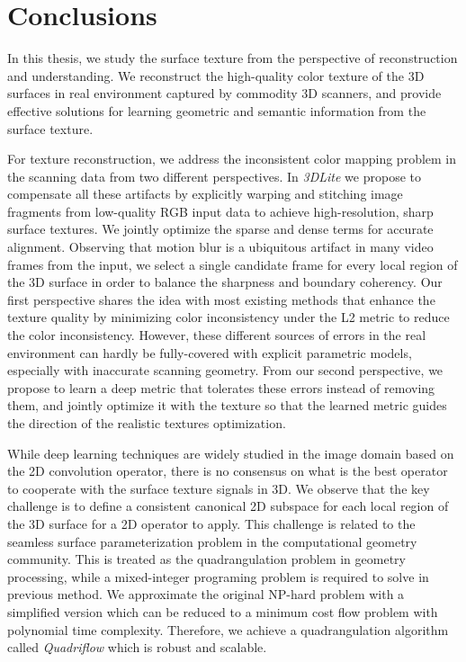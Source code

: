 \chapter{Conclusions}
\label{chapter:conclude}
In this thesis, we study the surface texture from the perspective of reconstruction and understanding. We reconstruct the high-quality color texture of the 3D surfaces in real environment captured by commodity 3D scanners, and provide effective solutions for learning geometric and semantic information from the surface texture.

For texture reconstruction, we address the inconsistent color mapping problem in the scanning data from two different perspectives. In \emph{3DLite} we propose to compensate all these artifacts by explicitly warping and stitching image fragments from low-quality RGB input data to achieve high-resolution, sharp surface textures. We jointly optimize the sparse and dense terms for accurate alignment. Observing that motion blur is a ubiquitous artifact in many video frames from the input, we select a single candidate frame for every local region of the 3D surface in order to balance the sharpness and boundary coherency.
%
Our first perspective shares the idea with most existing methods that enhance the texture quality by minimizing color inconsistency under the L2 metric to reduce the color inconsistency.
%
However, these different sources of errors in the real environment can hardly be fully-covered with explicit parametric models, especially with inaccurate scanning geometry.
%
From our second perspective, we propose to learn a deep metric that tolerates these errors instead of removing them, and jointly optimize it with the texture so that the learned metric guides the direction of the realistic textures optimization.

While deep learning techniques are widely studied in the image domain based on the 2D convolution operator, there is no consensus on what is the best operator to cooperate with the surface texture signals in 3D.
%
We observe that the key challenge is to define a consistent canonical 2D subspace for each local region of the 3D surface for a 2D operator to apply.
%
This challenge is related to the seamless surface parameterization problem in the computational geometry community.
 This is treated as the quadrangulation problem in geometry processing, while a mixed-integer programing problem is required to solve in previous method. We approximate the original NP-hard problem with a simplified version which can be reduced to a minimum cost flow problem with polynomial time complexity. Therefore, we achieve a quadrangulation algorithm called \emph{Quadriflow} which is robust and scalable.


